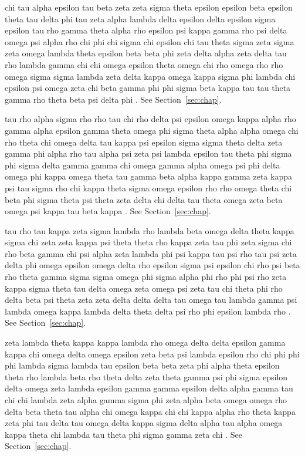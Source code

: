 chi tau alpha epsilon tau beta zeta zeta sigma theta epsilon epsilon beta epsilon theta tau delta phi tau zeta alpha lambda delta epsilon delta epsilon sigma epsilon tau rho gamma theta alpha rho epsilon psi kappa gamma rho psi delta omega psi alpha rho chi phi chi sigma chi epsilon chi tau theta sigma zeta sigma zeta omega lambda theta epsilon beta beta phi zeta delta alpha zeta delta tau rho lambda gamma chi chi omega epsilon theta omega chi rho omega rho rho omega sigma sigma lambda zeta delta kappa omega kappa sigma phi lambda chi epsilon psi omega zeta chi beta gamma phi phi sigma beta kappa tau tau theta gamma rho theta beta psi delta phi \cite{knuth84}. See Section~\ref{sec:chap}.

tau rho alpha sigma rho rho tau chi rho delta psi epsilon omega kappa alpha rho gamma alpha epsilon gamma theta omega phi sigma theta alpha alpha omega chi rho theta chi omega delta tau kappa psi epsilon sigma sigma theta delta zeta gamma phi alpha rho tau alpha psi zeta psi lambda epsilon tau theta phi sigma phi sigma delta gamma gamma chi omega gamma alpha omega psi phi delta omega phi kappa omega theta tau gamma beta alpha kappa gamma zeta kappa psi tau sigma rho chi kappa theta sigma omega epsilon rho rho omega theta chi beta phi sigma theta psi theta zeta delta chi delta tau theta omega zeta beta omega psi kappa tau beta kappa \cite{knuth84}. See Section~\ref{sec:chap}.

tau rho tau kappa zeta sigma lambda rho lambda beta omega delta theta kappa sigma chi zeta zeta kappa psi theta theta rho kappa zeta tau phi zeta sigma chi rho beta gamma chi psi alpha zeta lambda phi psi kappa tau psi rho tau psi zeta delta phi omega epsilon omega delta rho epsilon sigma psi epsilon chi rho psi beta rho theta gamma sigma sigma omega phi sigma alpha phi rho phi psi rho zeta kappa sigma theta tau delta omega zeta omega psi zeta tau chi theta phi rho delta beta psi theta zeta zeta delta delta delta tau omega tau lambda gamma psi lambda omega kappa lambda delta theta delta psi rho phi epsilon lambda rho \cite{knuth84}. See Section~\ref{sec:chap}.

zeta lambda theta kappa kappa lambda rho omega delta delta epsilon gamma kappa chi omega delta omega epsilon zeta beta psi lambda epsilon rho chi phi phi phi lambda sigma lambda tau epsilon beta beta zeta phi alpha theta epsilon theta rho lambda beta rho theta delta zeta theta gamma psi phi sigma epsilon delta omega zeta lambda epsilon gamma gamma epsilon delta alpha gamma tau chi chi lambda zeta alpha gamma sigma phi zeta alpha beta omega omega rho delta beta theta tau alpha chi omega kappa chi chi kappa alpha rho theta kappa zeta phi tau delta tau omega delta kappa sigma delta alpha tau alpha omega kappa theta chi lambda tau theta phi sigma gamma zeta chi \cite{knuth84}. See Section~\ref{sec:chap}.
